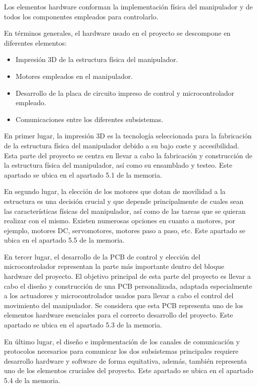 Los elementos hardware conforman la implementación física del manipulador y de todos los componentes empleados para controlarlo.

En términos generales, el hardware usado en el proyecto se descompone en diferentes elementos:
\begin{itemize}
    \item Impresión 3D de la estructura física del manipulador.
    \item Motores empleados en el manipulador.
    \item Desarrollo de la placa de circuito impreso de control y microcontrolador empleado.
    \item Comunicaciones entre los diferentes subsistemas.
\end{itemize}

En primer lugar, la impresión 3D es la tecnología seleccionada para la fabricación de la estructura física del manipulador debido a su bajo coste y accesibilidad. Esta parte del proyecto se centra en llevar a cabo la fabricación y construcción de la estructura física del manipulador, así como su ensamblado y testeo. Este apartado se ubica en el apartado 5.1 de la memoria.

En segundo lugar, la elección de los motores que dotan de movilidad a la estructura es una decisión crucial y que depende principalmente de cuales sean las características físicas del manipulador, así como de las tareas que se quieran realizar con el mismo. Existen numerosas opciones en cuanto a motores, por ejemplo, motores DC, servomotores, motores paso a paso, etc. Este apartado se ubica en el apartado 5.5 de la memoria.

En tercer lugar, el desarrollo de la PCB de control y elección del microcontrolador representan la parte más importante dentro del bloque hardware del proyecto. El objetivo principal de esta parte del proyecto es llevar a cabo el diseño y construcción de una PCB personalizada, adaptada especialmente a los actuadores y microcontrolador usados para llevar a cabo el control del movimiento del manipulador. Se considera que esta PCB representa uno de los elementos hardware esenciales para el correcto desarrollo del proyecto. Este apartado se ubica en el apartado 5.3 de la memoria.

En último lugar, el diseño e implementación de los canales de comunicación y protocolos necesarios para comunicar los dos subsistemas principales requiere desarrollo hardware y software de forma equitativa, además, también representa uno de los elementos cruciales del proyecto. Este apartado se ubica en el apartado 5.4 de la memoria.




